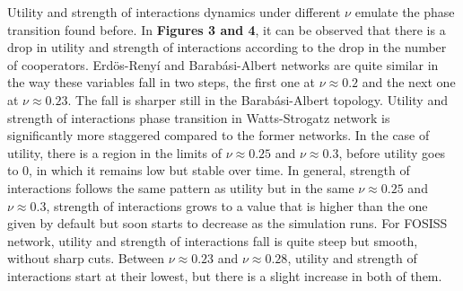 \documentclass[11pt]{article}
\begin{document}
\FloatBarrier

Utility and strength of interactions dynamics under different $\nu$ emulate the
phase transition found before. In \textbf{Figures 3 and 4}, it can be observed
that there is a drop in utility and strength of interactions according to the
drop in the number of cooperators. Erd\"{o}s-Reny\'i and Barab\'asi-Albert
networks are quite similar in the way these variables fall in two steps, the
first one at $\nu \approx 0.2$ and the next one at $\nu \approx 0.23$. The fall
is sharper still in the Barab\'asi-Albert topology. Utility and strength of
interactions phase transition in Watts-Strogatz network is significantly more
staggered compared to the former networks. In the case of utility, there is a
region in the limits of $\nu \approx 0.25$ and $\nu \approx 0.3$, before utility
goes to $0$, in which it remains low but stable over time. In general, strength
of interactions follows the same pattern as utility but in the same $\nu \approx
0.25$ and $\nu \approx 0.3$, strength of interactions grows to a value that is
higher than the one given by default but soon starts to decrease as the
simulation runs. For FOSISS network, utility and strength of interactions fall
is quite steep but smooth, without sharp cuts. Between $\nu \approx 0.23$ and
$\nu \approx 0.28$, utility and strength of interactions start at their lowest,
but there is a slight increase in both of them.
\end{document}
